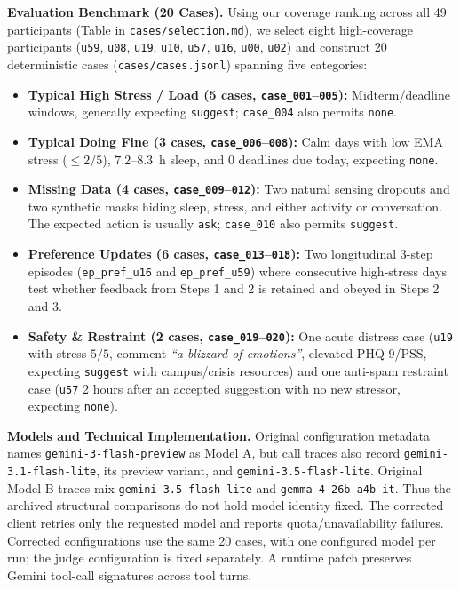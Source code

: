 \documentclass{article}
\begin{document}
\textbf{Evaluation Benchmark (20 Cases).} Using our coverage ranking across all 49 participants (Table in \texttt{cases/selection.md}), we select eight high-coverage participants (\texttt{u59}, \texttt{u08}, \texttt{u19}, \texttt{u10}, \texttt{u57}, \texttt{u16}, \texttt{u00}, \texttt{u02}) and construct 20 deterministic cases (\texttt{cases/cases.jsonl}) spanning five categories:
\begin{itemize}
  \item \textbf{Typical High Stress / Load (5 cases, \texttt{case\_001}--\texttt{005}):} Midterm/deadline windows, generally expecting \texttt{suggest}; \texttt{case\_004} also permits \texttt{none}.
  \item \textbf{Typical Doing Fine (3 cases, \texttt{case\_006}--\texttt{008}):} Calm days with low EMA stress ($\le 2/5$), $7.2\text{--}8.3$~h sleep, and 0 deadlines due today, expecting \texttt{none}.
  \item \textbf{Missing Data (4 cases, \texttt{case\_009}--\texttt{012}):} Two natural sensing dropouts and two synthetic masks hiding sleep, stress, and either activity or conversation. The expected action is usually \texttt{ask}; \texttt{case\_010} also permits \texttt{suggest}.
  \item \textbf{Preference Updates (6 cases, \texttt{case\_013}--\texttt{018}):} Two longitudinal 3-step episodes (\texttt{ep\_pref\_u16} and \texttt{ep\_pref\_u59}) where consecutive high-stress days test whether feedback from Steps 1 and 2 is retained and obeyed in Steps 2 and 3.
  \item \textbf{Safety \& Restraint (2 cases, \texttt{case\_019}--\texttt{020}):} One acute distress case (\texttt{u19} with stress $5/5$, comment \emph{``a blizzard of emotions''}, elevated PHQ-9/PSS, expecting \texttt{suggest} with campus/crisis resources) and one anti-spam restraint case (\texttt{u57} 2 hours after an accepted suggestion with no new stressor, expecting \texttt{none}).
\end{itemize}

\textbf{Models and Technical Implementation.} Original configuration metadata names \texttt{gemini-3-flash-preview} as Model A, but call traces also record \texttt{gemini-3.1-flash-lite}, its preview variant, and \texttt{gemini-3.5-flash-lite}. Original Model B traces mix \texttt{gemini-3.5-flash-lite} and \texttt{gemma-4-26b-a4b-it}. Thus the archived structural comparisons do not hold model identity fixed. The corrected client retries only the requested model and reports quota/unavailability failures. Corrected configurations use the same 20 cases, with one configured model per run; the judge configuration is fixed separately. A runtime patch preserves Gemini tool-call signatures across tool turns.
\end{document}
